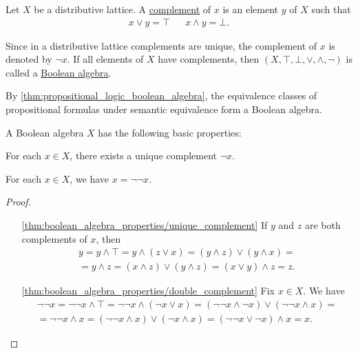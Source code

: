 \begin{definition}\label{def:boolean_algebra}\cite{nLab:boolean_algebra}
  Let $X$ be a distributive lattice. A \uline{complement} of $x$ is an element $y$ of $X$ such that
  \begin{align*}
    x \lor y = \top && x \land y = \bot.
  \end{align*}

  Since in a distributive lattice complements are unique, the complement of $x$ is denoted by $\neg x$. If all elements of $X$ have complements, then $(X, \top, \bot, \lor, \land, \neg)$ is called a \uline{Boolean algebra}.
\end{definition}

\begin{example}\label{ex:boolean_algebra}
  By \cref{thm:propositional_logic_boolean_algebra}, the equivalence classes of propositional formulas under semantic equivalence form a Boolean algebra.
\end{example}

\begin{proposition}\label{thm:boolean_algebra_properties}
  A Boolean algebra $X$ has the following basic properties:
  \begin{defenum}
    \item\label{thm:boolean_algebra_properties/unique_complement} For each $x \in X$, there exists a unique complement $\neg x$.
    \item\label{thm:boolean_algebra_properties/double_complement} For each $x \in X$, we have $x = \neg \neg x$.
  \end{defenum}
\end{proposition}
\begin{proof}\mbox{}
  \begin{itemize}
    \item[\ref{thm:boolean_algebra_properties/unique_complement}] If $y$ and $z$ are both complements of $x$, then
    \begin{align*}
      y
      =
      y \land \top
      =
      y \land (z \lor x)
      =
      (y \land z) \lor (y \land x)
      = \\ =
      y \land z
      =
      (x \land z) \lor (y \land z)
      =
      (x \lor y) \land z
      =
      z.
    \end{align*}

    \item[\ref{thm:boolean_algebra_properties/double_complement}] Fix $x \in X$. We have
    \begin{align*}
      \neg \neg x
      =
      \neg \neg x \land \top
      =
      \neg \neg x \land (\neg x \lor x)
      =
      (\neg \neg x \land \neg x) \lor (\neg \neg x \land x)
      = \\ =
      \neg \neg x \land x
      =
      (\neg \neg x \land x) \lor (\neg x \land x)
      =
      (\neg \neg x \lor \neg x) \land x
      =
      x.
    \end{align*}
  \end{itemize}
\end{proof}
